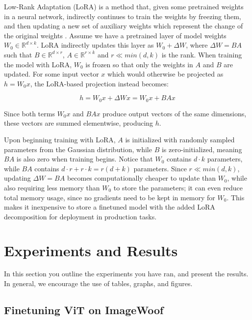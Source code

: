 \documentclass[10pt]{article}
\begin{document}
Low-Rank Adaptation (LoRA) is a method that, given some pretrained weights in a neural network, indirectly continues to train the weights by freezing them, and then updating a new set of auxiliary weights which represent the change of the original weights \cite{hu2021loralowrankadaptationlarge}. Assume we have a pretrained layer of model weights $W_0 \in \mathbb{R}^{d \times k}$. LoRA indirectly updates this layer as $W_0 + \Delta W$, where $\Delta W = BA$ such that $B \in \mathbb{R}^{d \times r}$, $A \in \mathbb{R}^{r \times k}$ and $r \ll min(d, k)$ is the rank. When training the model with LoRA, $W_0$ is frozen so that only the weights in $A$ and $B$ are updated. For some input vector $x$ which would otherwise be projected as $h = W_0x$, the LoRA-based projection instead becomes:

\begin{equation}
    h = W_0x + \Delta Wx = W_0x + BAx
\end{equation}

Since both terms $W_0x$ and $BAx$ produce output vectors of the same dimensions, these vectors are summed elementwise, producing $h$.

Upon beginning training with LoRA, $A$ is initialized with randomly sampled parameters from the Gaussian distribution, while $B$ is zero-initialized, meaning $BA$ is also zero when training begins. Notice that $W_0$ contains $d \cdot k$ parameters, while $BA$ contains $d \cdot r + r \cdot k = r(d + k)$ parameters. Since $r \ll min(d, k)$, updating $\Delta W = BA$ becomes computationally cheaper to update than $W_0$, while also requiring less memory than $W_0$ to store the parameters; it can even reduce total memory usage, since no gradients need to be kept in memory for $W_0$. This makes it inexpensive to store a finetuned model with the added LoRA decomposition for deployment in production tasks.

\section{Experiments and Results}
In this section you outline the experiments you have ran, and present the results.
In general, we encourage the use of tables, graphs, and figures.

\subsection{Finetuning ViT on ImageWoof}
\label{subsec:finetuning_vit_imagewoof}
\end{document}
